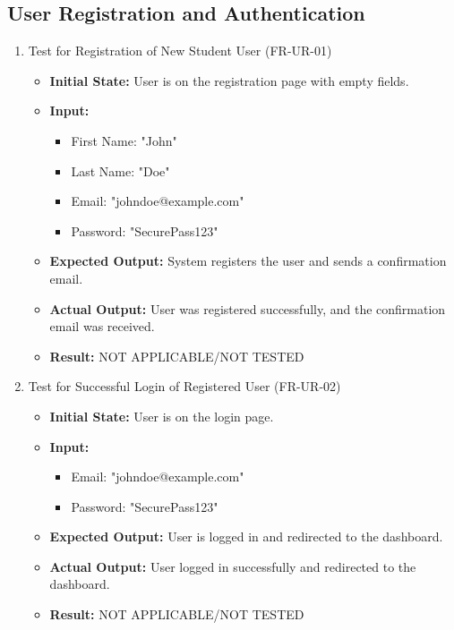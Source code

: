 \documentclass[12pt, titlepage]{article}
\begin{document}
\subsection{User Registration and Authentication}
\begin{enumerate}
    \item Test for Registration of New Student User (FR-UR-01)
    \begin{itemize}
        \item \textbf{Initial State:} User is on the registration page with empty fields.
        \item \textbf{Input:}
        \begin{itemize}
            \item First Name: "John"
            \item Last Name: "Doe"
            \item Email: "johndoe@example.com"
            \item Password: "SecurePass123"
        \end{itemize}
        \item \textbf{Expected Output:} System registers the user and sends a confirmation email.
        \item \textbf{Actual Output:} User was registered successfully, and the confirmation email was received.
        \item \textbf{Result:} NOT APPLICABLE/NOT TESTED
    \end{itemize}
    
    \item Test for Successful Login of Registered User (FR-UR-02)
    \begin{itemize}
        \item \textbf{Initial State:} User is on the login page.
        \item \textbf{Input:}
        \begin{itemize}
            \item Email: "johndoe@example.com"
            \item Password: "SecurePass123"
        \end{itemize}
        \item \textbf{Expected Output:} User is logged in and redirected to the dashboard.
        \item \textbf{Actual Output:}  User logged in successfully and redirected to the dashboard.
        \item \textbf{Result:} NOT APPLICABLE/NOT TESTED
    \end{itemize}
    

\end{enumerate}
\end{document}
